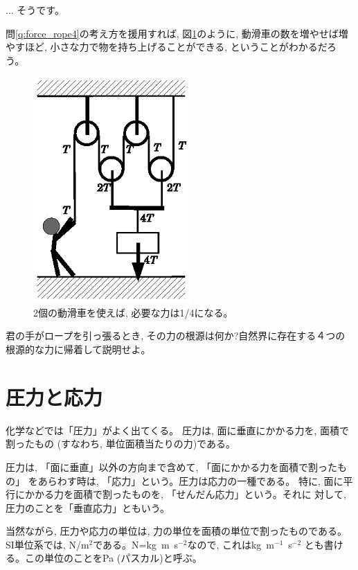 \begin{faq}{\small{}
... そうです。}\end{faq}\mv


問\ref{q:force_rope4}の考え方を援用すれば, 図\ref{fig:string4_iketeru}のように, 
動滑車の数を増やせば増やすほど, 小さな力で物を持ち上げることができる, ということがわかるだろう。
\begin{figure}[h]
    \centering
    \includegraphics[width=6cm]{string4_iketeru.eps}
    \caption{2個の動滑車を使えば, 必要な力は1/4になる。}\label{fig:string4_iketeru}
\end{figure}

%
\begin{q}\label{q:force_rope5}
君の手がロープを引っ張るとき, その力の根源は何か?自然界に存在する４つの
根源的な力に帰着して説明せよ。
\end{q}
\hv



\section{圧力と応力}

化学などでは「圧力」がよく出てくる。
圧力は, 面に垂直にかかる力を, 面積で割ったもの
(すなわち, 単位面積当たりの力)である。

圧力は, 「面に垂直」以外の方向まで含めて, 「面にかかる力を面積で割ったもの」
をあらわす時は, 「応力」という。圧力は応力の一種である。
特に, 面に平行にかかる力を面積で割ったものを, 「せんだん応力」という。それに
対して, 圧力のことを「垂直応力」ともいう。

当然ながら, 圧力や応力の単位は, 力の単位を面積の単位で割ったものである。
SI単位系では, N/m$^{2}$である。N=kg~m~s$^{-2}$なので, これはkg~m$^{-1}$~s$^{-2}$
とも書ける。この単位のことをPa (パスカル)と呼ぶ。

